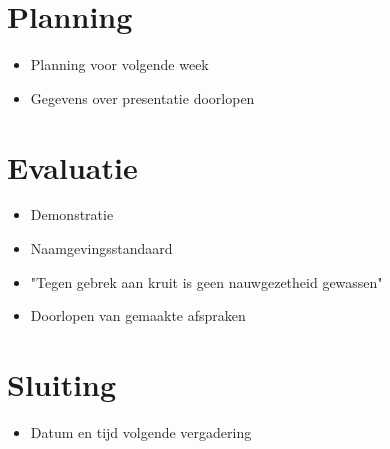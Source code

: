 \documentclass[]{article}
\begin{document}
\section{Planning}
  \begin{itemize}
    \item Planning voor volgende week
    \item Gegevens over presentatie doorlopen
  \end{itemize}

\section{Evaluatie}
  \begin{itemize}
    \item Demonstratie
    \item Naamgevingsstandaard
    \item "Tegen gebrek aan kruit is geen nauwgezetheid gewassen"
    \item Doorlopen van gemaakte afspraken
  \end{itemize}

\section{Sluiting}
    \begin{itemize}
    \item Datum en tijd volgende vergadering
    \end{itemize}
\end{document}

